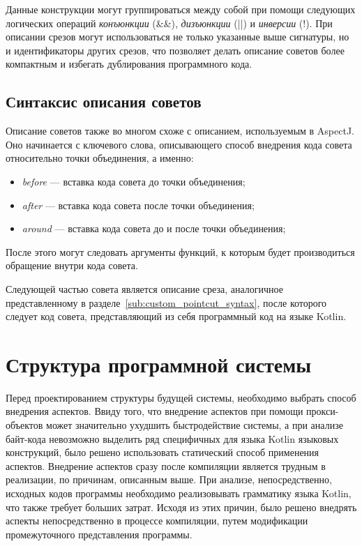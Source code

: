 Данные конструкции могут группироваться между собой при помощи следующих
логических операций \textit{конъюнкции} (\&\&),  \textit{дизъюнкции} (||)  и
\textit{инверсии} (!).
При описании срезов могут использоваться не только указанные выше сигнатуры, но
и идентификаторы других срезов, что позволяет делать описание советов более
компактным и избегать дублирования программного кода.
\subsection{Синтаксис описания советов}
\label{sub:custom_advice_syntax}
Описание советов также во многом схоже с описанием, используемым в AspectJ.
Оно начинается с ключевого слова, описывающего способ внедрения
кода совета относительно точки объединения, а именно:
\begin{itemize}
	\item \textit{before} --- вставка кода совета до точки объединения;
	\item \textit{after} --- вставка кода совета после точки объединения;
	\item \textit{around} --- вставка кода совета до и после точки объединения;
\end{itemize}
После этого могут следовать аргументы функций, к которым будет производиться
обращение внутри кода совета.

Следующей частью совета является описание среза, аналогичное представленному в
разделе~\ref{sub:custom_pointcut_syntax}, после которого следует код совета,
представляющий из себя программный код на языке Kotlin.
\section{Структура программной системы}
\label{sec:prototype_structure}
Перед проектированием структуры будущей системы, необходимо выбрать способ
внедрения аспектов.
Ввиду того, что внедрение аспектов при помощи прокси-объектов может значительно
ухудшить быстродействие системы, а при анализе байт-кода невозможно выделить
ряд специфичных для языка Kotlin языковых конструкций, было решено использовать
статический способ применения аспектов.
Внедрение аспектов сразу после компиляции является трудным в реализации, по
причинам, описанным выше.
При анализе, непосредственно, исходных кодов программы необходимо реализовывать
грамматику языка Kotlin, что также требует больших затрат.
Исходя из этих причин, было решено внедрять аспекты непосредственно в процессе
компиляции, путем модификации промежуточного представления программы.

